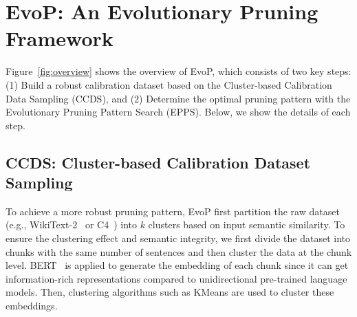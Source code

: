 \section{EvoP: An Evolutionary Pruning Framework}
\label{sec:dyna}

Figure~\ref{fig:overview} shows the overview of EvoP, which consists of two key steps: 
(1) Build a robust calibration dataset based on the Cluster-based Calibration Data Sampling (CCDS), 
and (2) Determine the optimal pruning pattern with the Evolutionary Pruning Pattern Search (EPPS).
Below, we show the details of each step.%


\subsection{CCDS: Cluster-based Calibration Dataset Sampling}
To achieve a more robust pruning pattern, EvoP first partition the raw dataset (e.g., WikiText-2~\cite{wikitext2} or C4~\cite{c4}) into $k$ clusters based on input semantic similarity. 
To ensure the clustering effect and semantic integrity, we first divide the dataset into chunks with the same number of sentences and then cluster the data at the chunk level.
BERT~\cite{BERT} is applied to generate the embedding of each chunk since it can get information-rich representations compared to unidirectional pre-trained language models.
Then, clustering algorithms such as KMeans are used to cluster these embeddings.

